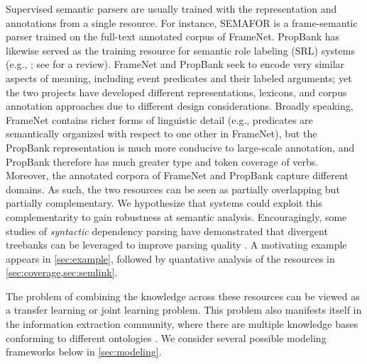\documentclass[11pt]{article}
\begin{document}
Supervised semantic parsers are usually trained with the representation and annotations from a single resource. 
For instance, SEMAFOR \citep{semafor,semafor-14} is a frame-semantic parser
trained on the full-text annotated corpus of FrameNet. 
PropBank has likewise served as the training resource for semantic role labeling (SRL) systems (e.g., \citealp{illinoisSRL}; see \citealp{palmer-10} for a review). 
FrameNet and PropBank seek to encode very similar aspects of meaning, including event predicates 
and their labeled arguments; yet the two projects have developed different representations, lexicons, 
and corpus annotation approaches due to different design considerations.
Broadly speaking, FrameNet contains richer forms of linguistic detail (e.g., predicates are semantically organized 
with respect to one other in FrameNet), but the PropBank representation is much more conducive to large-scale annotation, 
and PropBank therefore has much greater type and token coverage of verbs.
Moreover, the annotated corpora of FrameNet and PropBank capture different domains.
As such, the two resources can be seen as partially overlapping but partially complementary.
We hypothesize that systems could exploit this complementarity to gain robustness at semantic analysis. 
Encouragingly, some studies of \emph{syntactic} dependency parsing have demonstrated that divergent treebanks can be leveraged 
to improve parsing quality \citep{zhou:2013,johansson-13}.
A motivating example appears in \cref{sec:example}, followed by quantative analysis of the resources in \cref{sec:coverage,sec:semlink}.

The problem of combining the knowledge across these resources can be viewed as a 
transfer learning or joint learning problem. 
This problem also manifests itself in the information extraction community, where there are multiple knowledge bases conforming to different ontologies \citep[e.g.,][]{riedel-13}.  
We consider several possible modeling frameworks below in \cref{sec:modeling}. 
\end{document}
